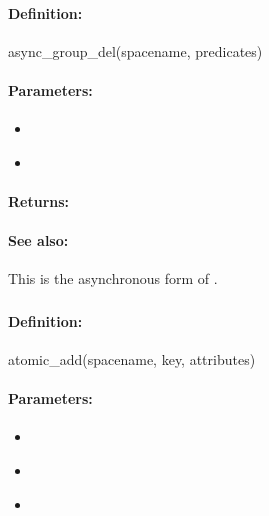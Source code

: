 \paragraph{Definition:}
\begin{rubycode}
async_group_del(spacename, predicates)
\end{rubycode}

\paragraph{Parameters:}
\begin{itemize}[noitemsep]
\item {}\\

\item {}\\

\end{itemize}

\paragraph{Returns:}


\paragraph{See also:}  This is the asynchronous form of .

\pagebreak
\subsubsection{}
\label{api:ruby:atomic_add}


\paragraph{Definition:}
\begin{rubycode}
atomic_add(spacename, key, attributes)
\end{rubycode}

\paragraph{Parameters:}
\begin{itemize}[noitemsep]
\item {}\\

\item {}\\

\item {}\\

\end{itemize}

